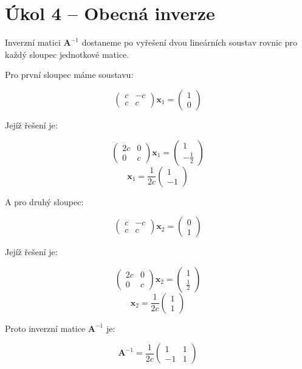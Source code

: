 \documentclass{fkssolpub}
\begin{document}
\section{Úkol 4 -- Obecná inverze}

Inverzní matici $\mathbf{A}^{-1}$ dostaneme po vyřešení dvou lineárních
soustav rovnic pro každý sloupec jednotkové matice.

Pro první sloupec máme soustavu:

\[
  \begin{pmatrix}
    c & -c \\ c & c
  \end{pmatrix} \mathbf{x}_1 = \begin{pmatrix}
    1 \\ 0
  \end{pmatrix}
\]

Jejíž řešení je:

\[
  \begin{pmatrix}
    2c & 0 \\ 0 & c
  \end{pmatrix} \mathbf{x}_1 = \begin{pmatrix}
    1 \\ -\frac{1}{2}
  \end{pmatrix}
\]
\[
  \mathbf{x}_1 = \frac{1}{2c} \begin{pmatrix}
    1 \\ -1
  \end{pmatrix}
\]

A pro druhý sloupec:

\[
  \begin{pmatrix}
    c & -c \\ c & c
  \end{pmatrix} \mathbf{x}_2 = \begin{pmatrix}
    0 \\ 1
  \end{pmatrix}
\]

Jejíž řešení je:

\[
  \begin{pmatrix}
    2c & 0 \\ 0 & c
  \end{pmatrix} \mathbf{x}_2 = \begin{pmatrix}
    1 \\ \frac{1}{2}
  \end{pmatrix}
\]
\[
  \mathbf{x}_2 = \frac{1}{2c} \begin{pmatrix}
    1 \\ 1
  \end{pmatrix}
\]

Proto inverzní matice $\mathbf{A}^{-1}$ je:

\[
  \mathbf{A}^{-1} = \frac{1}{2c} \begin{pmatrix}
    1 & 1 \\ -1 & 1
  \end{pmatrix}
\]
\end{document}
